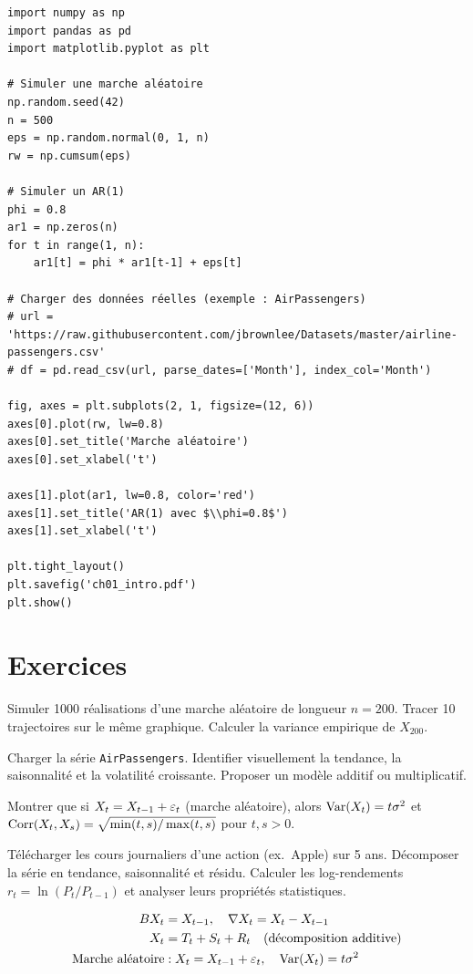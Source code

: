 \begin{codeblock}[title=\textbf{Python}]
\begin{verbatim}
import numpy as np
import pandas as pd
import matplotlib.pyplot as plt

# Simuler une marche aléatoire
np.random.seed(42)
n = 500
eps = np.random.normal(0, 1, n)
rw = np.cumsum(eps)

# Simuler un AR(1)
phi = 0.8
ar1 = np.zeros(n)
for t in range(1, n):
    ar1[t] = phi * ar1[t-1] + eps[t]

# Charger des données réelles (exemple : AirPassengers)
# url = 'https://raw.githubusercontent.com/jbrownlee/Datasets/master/airline-passengers.csv'
# df = pd.read_csv(url, parse_dates=['Month'], index_col='Month')

fig, axes = plt.subplots(2, 1, figsize=(12, 6))
axes[0].plot(rw, lw=0.8)
axes[0].set_title('Marche aléatoire')
axes[0].set_xlabel('t')

axes[1].plot(ar1, lw=0.8, color='red')
axes[1].set_title('AR(1) avec $\\phi=0.8$')
axes[1].set_xlabel('t')

plt.tight_layout()
plt.savefig('ch01_intro.pdf')
plt.show()
\end{verbatim}
\end{codeblock}

\section{Exercices}

\begin{exercice}[$\star$]
Simuler 1000 r\'ealisations d'une marche al\'eatoire de longueur $n=200$. Tracer 10 trajectoires sur le m\^eme graphique. Calculer la variance empirique de $X_{200}$.
\end{exercice}

\begin{exercice}[$\star$]
Charger la s\'erie \texttt{AirPassengers}. Identifier visuellement la tendance, la saisonnalit\'e et la volatilit\'e croissante. Proposer un mod\`ele additif ou multiplicatif.
\end{exercice}

\begin{exercice}[$\star\star$]
Montrer que si $X_t = X_{t-1}+\varepsilon_t$ (marche al\'eatoire), alors $\operatorname{Var}(X_t)=t\sigma^2$ et $\operatorname{Corr}(X_t,X_s)=\sqrt{\min(t,s)/\max(t,s)}$ pour $t,s>0$.
\end{exercice}

\begin{exercice}
T\'el\'echarger les cours journaliers d'une action (ex.\ Apple) sur 5 ans. D\'ecomposer la s\'erie en tendance, saisonnalit\'e et r\'esidu. Calculer les log-rendements $r_t=\ln(P_t/P_{t-1})$ et analyser leurs propri\'et\'es statistiques.
\end{exercice}

\begin{formules}
\begin{align*}
BX_t &= X_{t-1}, \quad \nabla X_t = X_t - X_{t-1} \\
X_t &= T_t + S_t + R_t \quad \text{(d\'ecomposition additive)} \\
\text{Marche al\'eatoire} &: X_t = X_{t-1}+\varepsilon_t, \quad \operatorname{Var}(X_t)=t\sigma^2
\end{align*}
\end{formules}
